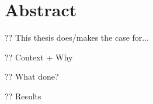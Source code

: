 \chapter*{Abstract}

?? This thesis does/makes the case for...

?? Context + Why

?? What done?

?? Results


